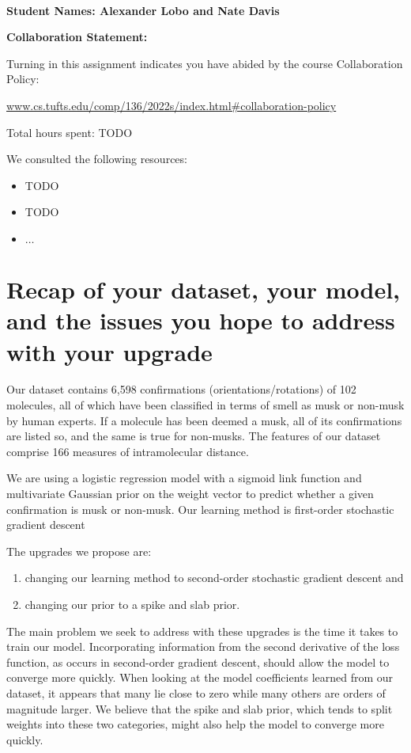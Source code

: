 \documentclass[12pt]{extarticle}
\begin{document}
~~\\ %

\begin{center}
{\Large{\bf Student Names: Alexander Lobo and Nate Davis}}
\end{center}

{\Large{\bf Collaboration Statement:}}

Turning in this assignment indicates you have abided by the course Collaboration Policy:

\url{www.cs.tufts.edu/comp/136/2022s/index.html#collaboration-policy}

Total hours spent: TODO

We consulted the following resources:
\begin{itemize}
\item TODO
\item TODO
\item $\ldots$	
\end{itemize}

\tableofcontents

\newpage

\section{Recap of your dataset, your model, and the issues you hope to address with your upgrade}

Our dataset contains 6,598 confirmations (orientations/rotations) of 102 molecules, all of which have been classified in terms of smell as musk or non-musk by human experts. If a molecule has been deemed a musk, all of its confirmations are listed so, and the same is true for non-musks. The features of our dataset comprise 166 measures of intramolecular distance.

We are using a logistic regression model with a sigmoid link function and multivariate Gaussian prior on the weight vector to predict whether a given confirmation is musk or non-musk. Our learning method is first-order stochastic gradient descent 

The upgrades we propose are:
\begin{enumerate}
    \item changing our learning method to second-order stochastic gradient descent and
    \item changing our prior to a spike and slab prior.
\end{enumerate}
The main problem we seek to address with these upgrades is the time it takes to train our model. Incorporating information from the second derivative of the loss function, as occurs in second-order gradient descent, should allow the model to converge more quickly. When looking at the model coefficients learned from our dataset, it appears that many lie close to zero while many others are orders of magnitude larger. We believe that the spike and slab prior, which tends to split weights into these two categories, might also help the model to converge more quickly.
\end{document}

